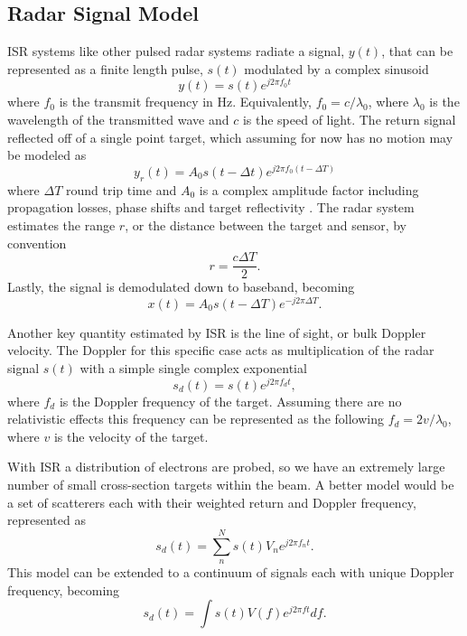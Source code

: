 \subsection{Radar Signal Model}
ISR systems like other pulsed radar systems radiate a signal, $y(t)$, that can be represented as a finite length pulse, $s(t)$ modulated by a complex sinusoid
\begin{equation}
\label{eqn:sigone}
y(t)=s(t)e^{j2\pi f_0 t}
\end{equation}
where $f_0$ is the transmit frequency in Hz. Equivalently, $ f_0=c/\lambda_0$, where $\lambda_0$ is the wavelength of the transmitted wave and $c$ is the speed of light. The return signal reflected off of a single point target, which assuming for now has no motion may be modeled as
\begin{equation}
\label{eqn:sigone}
y_r(t)=A_0s(t-\Delta t)e^{j2\pi f_0 (t-\Delta T)}
\end{equation}
where $\Delta T$ round trip time and $A_0$ is a complex amplitude factor including propagation losses, phase shifts and target reflectivity \cite{richards2014fundamentals}. The radar system estimates the range $r$, or the distance between the target and sensor, by convention
\begin{equation}
\label{eqn:range_intro}
r=\frac{c\Delta T}{2}.
\end{equation}
Lastly, the signal is demodulated down to baseband, becoming
\begin{equation}
\label{eqn:baseband}
x(t)=A_0s(t-\Delta T)e^{-j2\pi\Delta T}.
\end{equation}

Another key quantity estimated by ISR is the line of sight, or bulk Doppler velocity. The Doppler for this specific case acts as multiplication of the radar signal $s(t)$ with a simple single complex exponential
\begin{equation}
\label{simpledop}
s_d(t) = s(t)e^{j2\pi f_d t},
\end{equation}
 where $f_d$ is the Doppler frequency of the target. Assuming there are no relativistic effects this frequency can be represented as the following $f_d = 2v/\lambda_0 $, where $v$ is the velocity of the target. 

With ISR a distribution of electrons are probed, so we have an extremely large number of small cross-section targets within the beam. A better model would be a set of scatterers each with their weighted return and Doppler frequency, represented as
\begin{equation}
\label{multiDop}
\displaystyle s_d(t) = \sum_{n}^{N} s(t)V_ne^{j2\pi f_{n} t}.
\end{equation}
This model can be extended to a continuum of signals each with unique Doppler frequency, becoming
\begin{equation}
\label{conDop}
s_d(t) = \int s(t) V(f)e^{j2\pi ft} df.
\end{equation}

